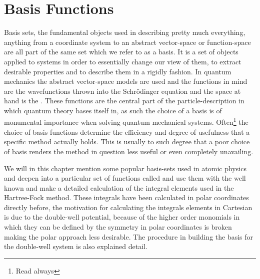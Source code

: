 \chapter{Basis Functions\label{chapter:4}}
    Basis sets, the fundamental objects used in describing pretty much
    everything, anything from a coordinate system to an abstract vector-space
    or function-space are all part of the same set which we refer to as a
    basis. It is a set of objects applied to systems in order to essentially
    change our view of them, to extract desirable properties and to describe
    them in a rigidly fashion. In quantum mechanics the abstract vector-space
    models are used and the functions in mind are the wavefunctions thrown into
    the Schrödinger equation and the space at hand is the .  These functions are the central part of the particle-description
    in which quantum theory bases itself in, as such the choice of a basis is
    of monumental importance when solving quantum mechanical systems.
    Often\footnote{Read always} the choice of basis functions determine the
    efficiency and degree of usefulness that a specific method actually holds.
    This is usually to such degree that a poor choice of basis renders the
    method in question less useful or even completely unavailing.

    We will in this chapter mention some popular basis-sets used in atomic
    physics and deepen into a particular set of functions called
     and use them with the well known
     and make a detailed calculation of the integral
    elements used in the Hartree-Fock method. These integrals have been
    calculated in polar coordinates directly before\cite{anisimovas}, the
    motivation for calculating the integrals elements in Cartesian is due to
    the double-well potential, because of the higher order monomials in which
    they can be defined by the symmetry in polar coordinates is broken making
    the polar approach less desirable. The procedure in building the basis for
    the double-well system is also explained detail.

